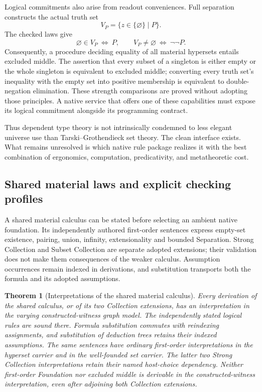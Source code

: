 \documentclass[11pt]{article}
\newtheorem{theorem}{Theorem}
\theoremstyle{definition}
\theoremstyle{remark}
\begin{document}
Logical commitments also arise from readout conveniences.  Full separation
constructs the actual truth set
\[
  V_P=\{z\in\{\varnothing\}\mid P\}.
\]
The checked laws give
\[
  \varnothing\in V_P\ \Longleftrightarrow\ P,
  \qquad
  V_P\ne\varnothing\ \Longleftrightarrow\ \neg\neg P.
\]
Consequently, a procedure deciding equality of all material hypersets entails
excluded middle.  The assertion that every subset of a singleton is either
empty or the whole singleton is equivalent to excluded middle; converting
every truth set's inequality with the empty set into positive membership is
equivalent to double-negation elimination.  These strength comparisons are
proved without adopting those principles.  A native service that offers one
of these capabilities must expose its logical commitment alongside its
programming contract.

Thus dependent type theory is not intrinsically condemned to less elegant
universe use than Tarski--Grothendieck set theory.  The clean interface exists.
What remains unresolved is which native rule package realizes it with the best
combination of ergonomics, computation, predicativity, and metatheoretic cost.

\subsection{Shared material laws and explicit checking profiles}

A shared material calculus can be stated before selecting an ambient native
foundation.  Its independently authored first-order sentences express empty-set
existence, pairing, union, infinity, extensionality and bounded Separation.
Strong Collection and Subset Collection are separate adopted extensions; their
validation does not make them consequences of the weaker calculus.  Assumption
occurrences remain indexed in derivations, and substitution transports both the
formula and its adopted assumptions.

\begin{theorem}[Interpretations of the shared material calculus]
Every derivation of the shared calculus, or of its two Collection extensions,
has an interpretation in the varying constructed-witness graph model.  The
independently stated logical rules are sound there.  Formula substitution
commutes with reindexing assignments, and substitution of deduction trees
retains their indexed assumptions.  The same sentences have ordinary first-order interpretations
in the hyperset carrier and in the well-founded set carrier.  The latter two
Strong Collection interpretations retain their named host-choice dependency.
Neither first-order Foundation nor excluded middle is derivable in the
constructed-witness interpretation, even after adjoining both Collection
extensions.
\end{theorem}
\end{document}
